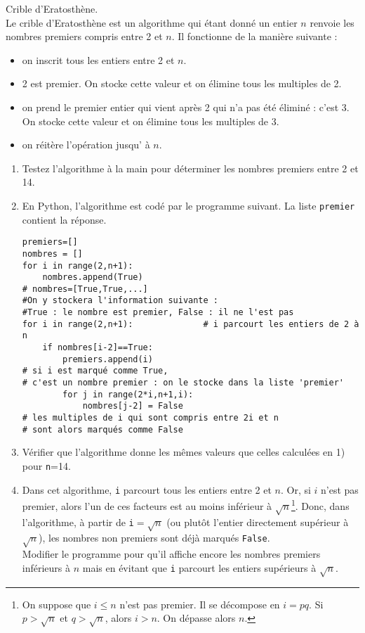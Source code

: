 \begin{exercice}Crible d'Eratosth\` ene.\\
Le crible d'Eratosth\` ene est un algorithme qui \' etant donn\' e un entier $n$ renvoie les nombres premiers compris entre 2 et $n$. Il fonctionne de la mani\` ere suivante :
\begin{itemize}
\item on inscrit tous les entiers entre 2 et $n$.
\item 2 est premier. On stocke cette valeur et on \' elimine tous les multiples de 2.
\item on prend le premier entier qui vient apr\` es 2 qui n'a pas \' et\' e \' elimin\' e : c'est 3. On stocke cette valeur et  on \' elimine tous les multiples de 3.
\item on r\' eit\` ere l'op\' eration jusqu' \` a $n$.
\end{itemize}
\begin{enumerate}
\item Testez l'algorithme \` a la main pour d\' eterminer les nombres premiers entre 2 et 14.
\item En Python, l'algorithme est cod\' e par le programme suivant. La liste \verb?premier? contient la réponse. 
\newpage
\begin{verbatim}
premiers=[] 
nombres = []
for i in range(2,n+1):
	nombres.append(True)    
# nombres=[True,True,...] 
#On y stockera l'information suivante : 
#True : le nombre est premier, False : il ne l'est pas
for i in range(2,n+1):              # i parcourt les entiers de 2 à n      
	if nombres[i-2]==True:         
		premiers.append(i)  
# si i est marqué comme True,
# c'est un nombre premier : on le stocke dans la liste 'premier'  		      
		for j in range(2*i,n+1,i): 
			nombres[j-2] = False   
# les multiples de i qui sont compris entre 2i et n   
# sont alors marqués comme False			
\end{verbatim}
\item V\' erifier que l'algorithme donne les m\^ emes valeurs que celles calcul\' ees en 1) pour \verb?n?=14.
\item Dans cet algorithme, \verb?i? parcourt tous les entiers entre 2 et $n$. Or, si $i$ n'est pas premier, alors l'un de ces facteurs est au moins inf\' erieur \` a $\sqrt{n}$\footnote{On suppose que $i\leq n$ n'est pas premier. Il se d\' ecompose en $i=pq$. Si $p> \sqrt{n}$ et $q>\sqrt{n}$, alors $i>n$. On d\' epasse alors $n$.}. Donc, dans l'algorithme, \` a partir de \verb?i?$=\sqrt{n}$ (ou plut\^ ot l'entier directement sup\' erieur \` a $\sqrt{n}$), les nombres non premiers sont d\' ej\` a marqu\' es \verb?False?.  \\
Modifier le programme pour qu'il affiche encore les nombres premiers inf\' erieurs \` a $n$ mais en \' evitant que \verb?i? parcourt les entiers sup\' erieurs \` a $\sqrt{n}$.
\end{enumerate}
\end{exercice}



